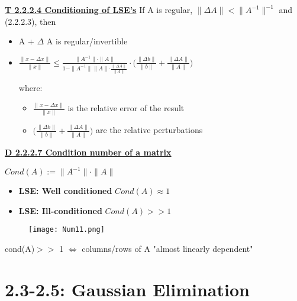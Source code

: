 \documentclass[8pt]{extreport}
\begin{document}
\underline{\textbf{T 2.2.2.4 Conditioning of LSE's}} If A is regular, $\parallel \Delta A \parallel < \parallel A^{-1} \parallel^{-1}$ and (2.2.2.3), then 
\begin{itemize}
\item A + $\Delta$ A is regular/invertible
\item 
\begin{center}
$\frac{\parallel x - \Delta x \parallel}{\parallel x \parallel} \leq \frac{\parallel A^{-1}\parallel \cdot \parallel A \parallel}{1- \parallel A^{-1}\parallel \parallel A \parallel \cdot \frac{\parallel \Delta A \parallel}{\parallel A \parallel}}\cdot \big( \frac{\parallel \Delta b \parallel}{\parallel b \parallel} + \frac{\parallel \Delta A \parallel}{\parallel A \parallel} \big)$
\end{center}
where:
\begin{itemize}
\item $\frac{\parallel x - \Delta x \parallel}{\parallel x \parallel}$ is the relative error of the result 
\item $\big( \frac{\parallel \Delta b \parallel}{\parallel b \parallel} + \frac{\parallel \Delta A \parallel}{\parallel A \parallel} \big)$ are the relative perturbations
\end{itemize}

\end{itemize}

\underline{\textbf{D 2.2.2.7 Condition number of a matrix}}
\begin{center}
$Cond(A) := \parallel A^{-1} \parallel \cdot \parallel A \parallel$
\end{center}
\begin{itemize}
\item \textbf{LSE: Well conditioned} $Cond(A) \approx 1$
\item \textbf{LSE: Ill-conditioned} $Cond(A) >> 1$
\end{itemize}
\begin{figure}[H]
\centering
\texttt{[image: Num11.png]}
\end{figure}

\begin{center}
cond(A)$>>$ 1 $\iff$ columns/rows of A "almost linearly dependent"
\end{center}
\section{2.3-2.5: Gaussian Elimination}
\end{document}
